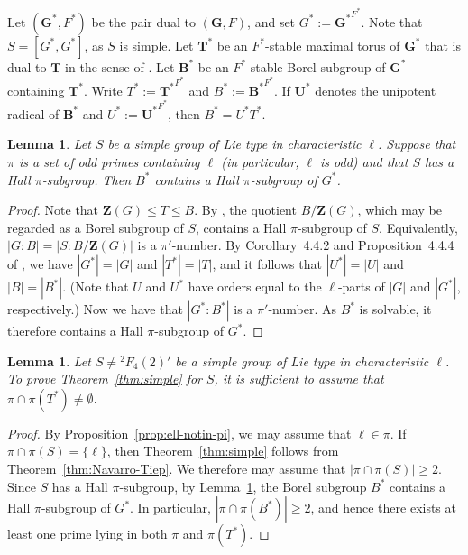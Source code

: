 \documentclass[12pt]{amsart}
\newtheorem{lemma}[theorem]{Lemma}
\theoremstyle{definition}
\numberwithin{equation}{section}
\newcommand{\bG}{{\mathbf{G}}}
\newcommand{\bT}{{\mathbf{T}}}
\newcommand{\bB}{{\mathbf{B}}}
\newcommand{\bU}{{\mathbf{U}}}
\newcommand{\bZ}{{\mathbf{Z}}}
\begin{document}
Let $(\bG^*,F^*)$ be the pair dual to $(\bG,F)$, and set
$G^*:={\bG^*}^{F^*}$. Note that $S=[G^*,G^*]$, as $S$ is simple. Let
$\bT^*$ be an $F^*$-stable maximal torus of $\bG^*$ that is dual to
$\bT$ in the sense of \cite[Proposition~4.3.1]{Carter85}. Let
$\bB^*$ be an $F^*$-stable Borel subgroup of $\bG^*$ containing
$\bT^*$. Write $T^*:={\bT^*}^{F^*}$ and $B^*:={\bB^*}^{F^*}$. If
$\bU^*$ denotes the unipotent radical of $\bB^*$ and
$U^*:={\bU^*}^{F^*}$, then $B^*=U^*T^*$.


\begin{lemma}\label{lem:Gross}
Let $S$ be a simple group of Lie type in characteristic $\ell$.
Suppose that $\pi$ is a set of odd primes containing $\ell$ (in
particular, $\ell$ is odd) and that $S$ has a Hall $\pi$-subgroup.
Then $B^*$ contains a Hall $\pi$-subgroup of $G^*$.
\end{lemma}

\begin{proof}
Note that $\bZ(G)\le T\le B$. By \cite[Theorem~3.2]{G86}, the
quotient $B/\bZ(G)$, which may be regarded as a Borel subgroup of
$S$, contains a Hall $\pi$-subgroup of $S$. Equivalently, $|G:B| =
|S : B/\bZ(G)|$ is a $\pi'$-number. By Corollary~4.4.2 and
Proposition~4.4.4 of \cite{Carter85}, we have $|G^*|=|G|$ and
$|T^*|=|T|$, and it follows that $|U^*|=|U|$ and $|B|=|B^*|$. (Note
that $U$ and $U^*$ have orders equal to the $\ell$-parts of $|G|$
and $|G^*|$, respectively.) Now we have that $|G^*:B^*|$ is a
$\pi'$-number. As $B^*$ is solvable, it therefore contains a Hall
$\pi$-subgroup of $G^*$.
\end{proof}

\begin{lemma}\label{lem:Gross2}
Let $S\neq {}^2F_4(2)'$ be a simple group of Lie type in
characteristic $\ell$. To prove Theorem~\ref{thm:simple} for $S$, it
is sufficient to assume that $\pi\cap\pi(T^*)\neq\emptyset$.
\end{lemma}

\begin{proof}
By Proposition~\ref{prop:ell-notin-pi}, we may assume that
$\ell\in\pi$. If $\pi\cap \pi(S)=\{\ell\}$, then
Theorem~\ref{thm:simple} follows from
Theorem~\ref{thm:Navarro-Tiep}. We therefore may assume that
$|\pi\cap \pi(S)|\geq 2$. Since $S$ has a Hall $\pi$-subgroup, by
Lemma~\ref{lem:Gross}, the Borel subgroup $B^*$ contains a Hall
$\pi$-subgroup of $G^*$. In particular, $|\pi\cap \pi(B^*)|\geq 2$,
and hence there exists at least one prime lying in both $\pi$ and
$\pi(T^*)$.
\end{proof}
\end{document}
